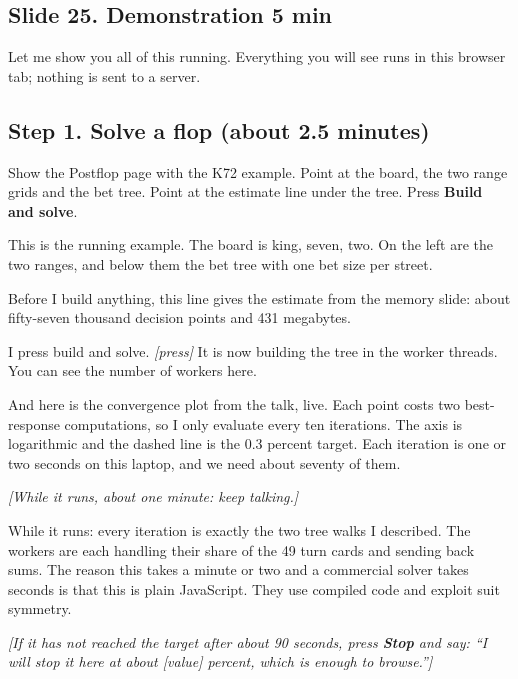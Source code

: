 \documentclass[11pt]{article}
\newcommand{\slidehead}[3]{\subsection*{Slide #1. #2 \hfill {\normalfont\small #3}}}
\newcommand{\cue}[1]{{\small\itshape\color{black!65}[#1]}}
\begin{document}
\slidehead{25}{Demonstration}{5 min}
\begin{say}
Let me show you all of this running. Everything you will see runs in this browser tab; nothing is sent to a server.
\end{say}

\subsection*{Step 1. Solve a flop (about 2.5 minutes)}
\begin{act}
Show the Postflop page with the K72 example. Point at the board, the two range grids and the bet tree. Point at the
estimate line under the tree. Press \textbf{Build and solve}.
\end{act}
\begin{say}
This is the running example. The board is king, seven, two. On the left are the two ranges, and below them the bet
tree with one bet size per street.

Before I build anything, this line gives the estimate from the memory slide: about fifty-seven thousand decision
points and 431 megabytes.

I press build and solve. \cue{press} It is now building the tree in the worker threads. You can see the number of
workers here.

And here is the convergence plot from the talk, live. Each point costs two best-response computations, so I only
evaluate every ten iterations. The axis is logarithmic and the dashed line is the 0.3 percent target. Each
iteration is one or two seconds on this laptop, and we need about seventy of them.
\end{say}
\cue{While it runs, about one minute: keep talking.}
\begin{say}
While it runs: every iteration is exactly the two tree walks I described. The workers are each handling their share
of the 49 turn cards and sending back sums. The reason this takes a minute or two and a commercial solver takes
seconds is that this is plain JavaScript. They use compiled code and exploit suit symmetry.
\end{say}
\cue{If it has not reached the target after about 90 seconds, press \textbf{Stop} and say: ``I will stop it here at
about [value] percent, which is enough to browse.''}
\end{document}
